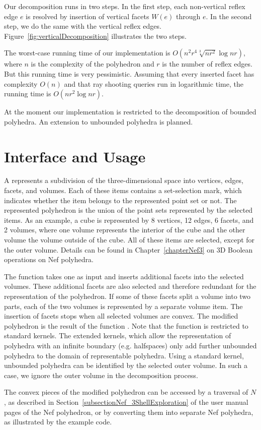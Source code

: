 Our decomposition runs in two steps. In the first step, each
non-vertical reflex edge $e$ is resolved by insertion of vertical
facets $W(e)$ through $e$. In the second step, we do the same with the
vertical reflex edges. Figure~\ref{fig:verticalDecomposition}
illustrates the two steps.

The worst-case running time of our implementation is
$O(n^2r^4\sqrt[3]{nr^2}\log{nr})$, where $n$ is the complexity of the
polyhedron and $r$ is the number of reflex edges. But this running
time is very pessimistic. Assuming that every inserted facet has
complexity $O(n)$ and that ray shooting queries run in logarithmic
time, the running time is $O(nr^2\log{nr})$.

At the moment our implementation is restricted to the decomposition of
bounded polyhedra. An extension to unbounded polyhedra is planned.

\section{Interface and Usage}

A  represents a subdivision of the
three-dimensional space into vertices, edges, facets, and
volumes. Each of these items contains a set-selection mark, which
indicates whether the item belongs to the represented point set or
not. The represented polyhedron is the union of the point sets
represented by the selected items. As an example, a cube is
represented by 8 vertices, 12 edges, 6 facets, and 2 volumes, where
one volume represents the interior of the cube and the other volume the
volume outside of the cube. All of these items are selected, except
for the outer volume.  Details can be found in Chapter~\ref{chapterNef3} 
on 3D Boolean operations on Nef polyhedra.

The function  takes one
 as input and inserts additional facets into the
selected volumes. These additional facets are also selected and
therefore redundant for the representation of the polyhedron. If some
of these facets split a volume into two parts, each of the two volumes
is represented by a separate volume item. The insertion of facets
stops when all selected volumes are convex. The modified
polyhedron is the result of the function
. Note that the function 
 is restricted to standard kernels. 
The extended kernels, which allow the representation of polyhedra with
an infinite boundary (e.g. halfspaces) only add further unbounded
polyhedra to the domain of representable polyhedra. Using a standard
kernel, unbounded polyhedra can be identified by the selected outer
volume. In such a case, we ignore the outer volume in the
decomposition process.

The convex pieces of the modified polyhedron can be accessed by
a traversal of $N$, as described in Section~\ref{subsectionNef_3ShellExploration} of the
user manual pages of the Nef polyhedron, or by converting
them into separate Nef polyhedra, as illustrated by the example code.

